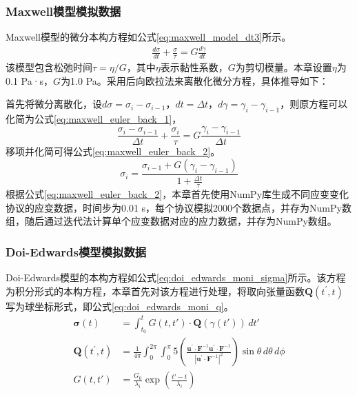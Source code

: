 \subsubsection{Maxwell模型模拟数据}
Maxwell模型的微分本构方程如公式\eqref{eq:maxwell_model_dt3}所示。
\begin{gather}
  \frac{d\sigma}{dt} + \frac{\sigma}{\tau}  = G \frac{d\gamma}{dt} \label{eq:maxwell_model_dt3}
\end{gather}
该模型包含松弛时间$\tau=\eta/G$，其中$\eta$表示黏性系数，$G$为剪切模量。本章设置$\eta$为0.1 Pa·s，$G$为1.0 Pa。采用后向欧拉法来离散化微分方程，具体推导如下：

首先将微分离散化，设$d\sigma=\sigma_i - \sigma_{i-1}$，$dt=\Delta t$，$d\gamma=\gamma_i - \gamma_{i-1}$，则原方程可以化简为公式\eqref{eq:maxwell_euler_back_1}，
\begin{equation}
  \frac{\sigma_i - \sigma_{i-1}}{\Delta t} + \frac{\sigma_i}{\tau} = G \frac{\gamma_i - \gamma_{i-1}}{\Delta t} \label{eq:maxwell_euler_back_1}
\end{equation}
移项并化简可得公式\eqref{eq:maxwell_euler_back_2}。
\begin{equation}
  \sigma_i = \frac{\sigma_{i-1} + G (\gamma_i - \gamma_{i-1})}{1 + \frac{\Delta t}{\tau}} \label{eq:maxwell_euler_back_2}
\end{equation}
根据公式\eqref{eq:maxwell_euler_back_2}，本章首先使用NumPy库生成不同应变变化协议的应变数据，时间步为0.01 s，每个协议模拟2000个数据点，并存为NumPy数组，随后通过迭代法计算单个应变数据对应的应力数据，并存为NumPy数组。

\subsubsection{Doi-Edwards模型模拟数据}
Doi-Edwards模型的本构方程如公式\eqref{eq:doi_edwards_moni_sigma}所示。该方程为积分形式的本构方程，本章首先对该方程进行处理，将取向张量函数$\mathbf{Q}(t^{\prime},t)$写为球坐标形式，即公式\eqref{eq:doi_edwards_moni_q}。
\begin{align}
  \boldsymbol{\sigma}(t)   & = \int_{t_0}^t G(t, t') \cdot \mathbf{Q}(\gamma(t')) \, dt' \label{eq:doi_edwards_moni_sigma}                                                                                                                                                                               \\
  \mathbf{Q}(t^{\prime},t) & = \frac{1}{4\pi} \int_{0}^{2\pi} \int_{0}^{\pi} 5 \left( \frac{\mathbf{u}^{\prime} \cdot \mathbf{F}^{-1} \mathbf{u}^{\prime} \cdot \mathbf{F}^{-1}}{|\mathbf{u}^{\prime} \cdot \mathbf{F}^{-1}|^{2}} \right) \sin\theta \, d\theta \, d\phi   \label{eq:doi_edwards_moni_q} \\
  G(t, t')                 & = \frac{G_0}{\lambda_i} \exp\left( \frac{t' - t}{\lambda_i} \right)   \label{eq:doi_edwards_moni_g}
\end{align}

